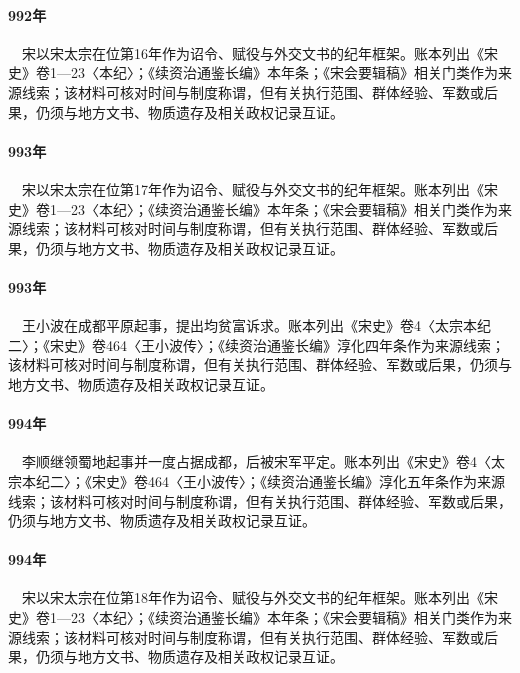 \paragraph{992年}　宋以宋太宗在位第16年作为诏令、赋役与外交文书的纪年框架。账本列出《宋史》卷1—23〈本纪〉；《续资治通鉴长编》本年条；《宋会要辑稿》相关门类作为来源线索；该材料可核对时间与制度称谓，但有关执行范围、群体经验、军数或后果，仍须与地方文书、物质遗存及相关政权记录互证。

\paragraph{993年}　宋以宋太宗在位第17年作为诏令、赋役与外交文书的纪年框架。账本列出《宋史》卷1—23〈本纪〉；《续资治通鉴长编》本年条；《宋会要辑稿》相关门类作为来源线索；该材料可核对时间与制度称谓，但有关执行范围、群体经验、军数或后果，仍须与地方文书、物质遗存及相关政权记录互证。

\paragraph{993年}　王小波在成都平原起事，提出均贫富诉求。账本列出《宋史》卷4〈太宗本纪二〉；《宋史》卷464〈王小波传〉；《续资治通鉴长编》淳化四年条作为来源线索；该材料可核对时间与制度称谓，但有关执行范围、群体经验、军数或后果，仍须与地方文书、物质遗存及相关政权记录互证。

\paragraph{994年}　李顺继领蜀地起事并一度占据成都，后被宋军平定。账本列出《宋史》卷4〈太宗本纪二〉；《宋史》卷464〈王小波传〉；《续资治通鉴长编》淳化五年条作为来源线索；该材料可核对时间与制度称谓，但有关执行范围、群体经验、军数或后果，仍须与地方文书、物质遗存及相关政权记录互证。

\paragraph{994年}　宋以宋太宗在位第18年作为诏令、赋役与外交文书的纪年框架。账本列出《宋史》卷1—23〈本纪〉；《续资治通鉴长编》本年条；《宋会要辑稿》相关门类作为来源线索；该材料可核对时间与制度称谓，但有关执行范围、群体经验、军数或后果，仍须与地方文书、物质遗存及相关政权记录互证。

